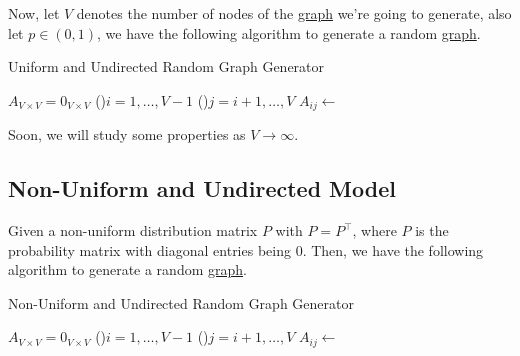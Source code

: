Now, let \(V\) denotes the number of nodes of the \hyperref[def:graph]{graph} we're going to generate,
also let \(p\in(0, 1)\), we have the following algorithm to generate a random \hyperref[def:graph]{graph}.

\par
\begin{algorithm}[H]\label{algo:uniform-and-undirected-model-algo}
	\DontPrintSemicolon
	\caption{Uniform and Undirected Random Graph Generator}
	\BlankLine

	\(A_{V\times V} = 0_{V \times V}\) 
	\;
	\For(){\(i= 1, \ldots  , V-1\)}{
		\For(){\(j=i+1, \ldots  , V\)}{
			\(A_{ij} \gets \)
		}
	}
	\;
\end{algorithm}

Soon, we will study some properties as \(V\to \infty\).

\subsection{Non-Uniform and Undirected Model}\label{subsec:non-uniform-and-undirected-model}
Given a non-uniform distribution matrix \(P\) with \(P = P^{\top}\), where \(P\) is the probability matrix with diagonal entries being \(0\).
Then, we have the following algorithm to generate a random \hyperref[def:graph]{graph}.
\par
\begin{algorithm}[H]\label{algo:non-uniform-and-undirected-model-algo}
	\DontPrintSemicolon
	\caption{Non-Uniform and Undirected Random Graph Generator}
	\BlankLine

	\(A_{V\times V} = 0_{V \times V}\) 
	\;
	\For(){\(i= 1, \ldots  , V-1\)}{
	\For(){\(j=i+1, \ldots  , V\)}{
	\(A_{ij} \gets \)
	}
	}
	\;
\end{algorithm}

